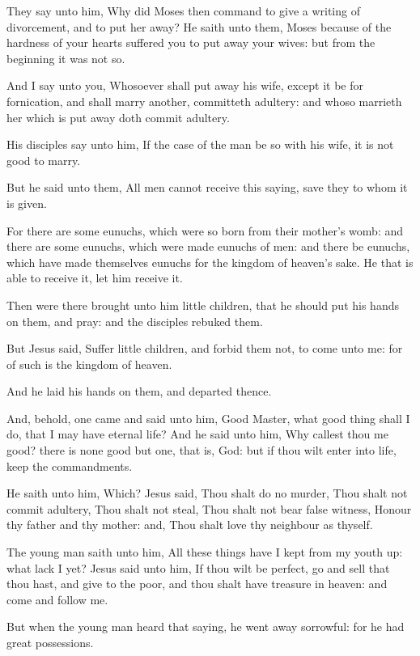 \verse They say unto him, Why did Moses then command to give a writing of divorcement, and to put her away?  \verse He saith unto them, Moses because of the hardness of your hearts suffered you to put away your wives: but from the beginning it was not so.

\verse And I say unto you, Whosoever shall put away his wife, except it be for fornication, and shall marry another, committeth adultery: and whoso marrieth her which is put away doth commit adultery.

\verse His disciples say unto him, If the case of the man be so with his wife, it is not good to marry.

\verse But he said unto them, All men cannot receive this saying, save they to whom it is given.

\verse For there are some eunuchs, which were so born from their mother's womb: and there are some eunuchs, which were made eunuchs of men: and there be eunuchs, which have made themselves eunuchs for the kingdom of heaven's sake. He that is able to receive it, let him receive it.

\verse Then were there brought unto him little children, that he should put his hands on them, and pray: and the disciples rebuked them.

\verse But Jesus said, Suffer little children, and forbid them not, to come unto me: for of such is the kingdom of heaven.

\verse And he laid his hands on them, and departed thence.

\verse And, behold, one came and said unto him, Good Master, what good thing shall I do, that I may have eternal life?  \verse And he said unto him, Why callest thou me good? there is none good but one, that is, God: but if thou wilt enter into life, keep the commandments.

\verse He saith unto him, Which? Jesus said, Thou shalt do no murder, Thou shalt not commit adultery, Thou shalt not steal, Thou shalt not bear false witness, \verse Honour thy father and thy mother: and, Thou shalt love thy neighbour as thyself.

\verse The young man saith unto him, All these things have I kept from my youth up: what lack I yet?  \verse Jesus said unto him, If thou wilt be perfect, go and sell that thou hast, and give to the poor, and thou shalt have treasure in heaven: and come and follow me.

\verse But when the young man heard that saying, he went away sorrowful: for he had great possessions.

